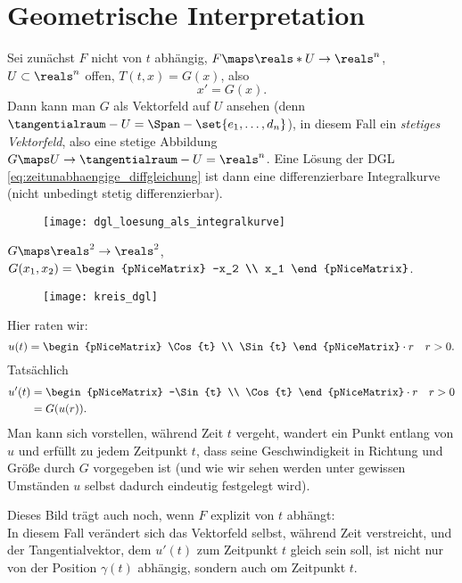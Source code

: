 \section*{Geometrische Interpretation}
Sei zunächst \( F \) nicht von \( t \) abhängig, \( F\maps \reals*U\to \reals^n \), \( U\subset \reals^n \) offen, \( T(t,x)=G(x) \), also
\begin{equation*}
  x'=G(x)\tag{\(**\)}\label{eq:zeitunabhaengige_diffgleichung}.
\end{equation*}
Dann kann man \( G \) als Vektorfeld auf \( U \) ansehen (denn \( \tangentialraum-{U}=\Span-{\set{e_1,\dotsc,d_n}} \)), in diesem Fall ein \emph{stetiges Vektorfeld}, also eine stetige Abbildung \( G\maps  U \to \tangentialraum-{U}=\reals^n \). Eine Lösung der DGL \eqref{eq:zeitunabhaengige_diffgleichung} ist dann eine differenzierbare Integralkurve (nicht unbedingt stetig differenzierbar).
\begin{figure}[H]
  \centering
  \texttt{[image: dgl\_loesung\_als\_integralkurve]}
  \label{fig:dgl_loesung_als_integralkurve}
\end{figure}
\begin{beispiel*}
  \( G\maps \reals^2\to \reals^2 \), \( G(x_1,x_2)=\begin{pNiceMatrix} -x_2 \\ x_1 \end{pNiceMatrix} \).
  \begin{figure}[H]
    \centering
    \texttt{[image: kreis\_dgl]}
    \label{fig:kreis_dgl}
  \end{figure}
  Hier raten wir:
  \begin{equation*}
    u(t)=\begin{pNiceMatrix} \Cos{t} \\ \Sin{t} \end{pNiceMatrix}\cdot r\quad r>0.
  \end{equation*}
  Tatsächlich
  \begin{align*}
    u'(t)&=\begin{pNiceMatrix} -\Sin{t} \\ \Cos{t} \end{pNiceMatrix}\cdot r\quad r>0\\
    &=G(u(r)).
  \end{align*}
  Man kann sich vorstellen, während Zeit \( t \) vergeht, wandert ein Punkt entlang von \( u \) und erfüllt zu jedem Zeitpunkt \( t \), dass seine Geschwindigkeit in Richtung und Größe durch \( G \) vorgegeben ist (und wie wir sehen werden unter gewissen Umständen \( u \) selbst dadurch eindeutig festgelegt wird). 
  
  Dieses Bild trägt auch noch, wenn \( F \) explizit von \( t \) abhängt:\\
  In diesem Fall verändert sich das Vektorfeld selbst, während Zeit verstreicht, und der Tangentialvektor, dem \( u'(t) \) zum Zeitpunkt \( t \) gleich sein soll, ist nicht nur von der Position \( \gamma(t) \) abhängig, sondern auch om Zeitpunkt \( t \).
\end{beispiel*}
